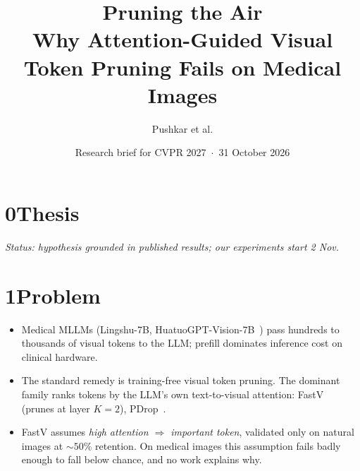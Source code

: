 \documentclass[11pt]{article}
\title{\vspace{-1.5em}\textbf{Pruning the Air}\\[2pt]
\large Why Attention-Guided Visual Token Pruning Fails on Medical Images}
\author{Pushkar et al.}
\date{Research brief for CVPR 2027 \,$\cdot$\, 31 October 2026}
\begin{document}
\maketitle
\vspace{-1.5em}

\section*{0\quad Thesis}
\noindent{}

{\small\emph{Status: hypothesis grounded in published results; our experiments start 2 Nov.}}

\section*{1\quad Problem}
\begin{itemize}
  \item Medical MLLMs (Lingshu-7B, HuatuoGPT-Vision-7B~\cite{huatuo}) pass hundreds to thousands
        of visual tokens to the LLM; prefill dominates inference cost on clinical hardware.
  \item The standard remedy is training-free visual token pruning. The dominant family ranks
        tokens by the LLM's own text-to-visual attention: FastV~\cite{fastv} (prunes at layer
        $K{=}2$), PDrop~\cite{pdrop}.
  \item FastV assumes \emph{high attention $\Rightarrow$ important token}, validated only on
        natural images at ${\sim}50\%$ retention. On medical images this assumption fails
        badly enough to fall below chance, and no work explains why.
\end{itemize}

\end{document}
